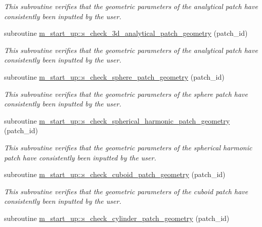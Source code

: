 \begin{DoxyCompactItemize}
\begin{DoxyCompactList}\small\item\em This subroutine verifies that the geometric parameters of the analytical patch have consistently been inputted by the user. \end{DoxyCompactList}\item 
subroutine \hyperlink{namespacem__start__up_a936948a39ac13e74203588cae06b325f}{m\+\_\+start\+\_\+up\+::s\+\_\+check\+\_\+3d\+\_\+analytical\+\_\+patch\+\_\+geometry} (patch\+\_\+id)
\begin{DoxyCompactList}\small\item\em This subroutine verifies that the geometric parameters of the analytical patch have consistently been inputted by the user. \end{DoxyCompactList}\item 
subroutine \hyperlink{namespacem__start__up_a3bc334d434726c8cdba2f5d611ec4d42}{m\+\_\+start\+\_\+up\+::s\+\_\+check\+\_\+sphere\+\_\+patch\+\_\+geometry} (patch\+\_\+id)
\begin{DoxyCompactList}\small\item\em This subroutine verifies that the geometric parameters of the sphere patch have consistently been inputted by the user. \end{DoxyCompactList}\item 
subroutine \hyperlink{namespacem__start__up_a59bfdd1a0d03041d57f7f9e7e1a38a97}{m\+\_\+start\+\_\+up\+::s\+\_\+check\+\_\+spherical\+\_\+harmonic\+\_\+patch\+\_\+geometry} (patch\+\_\+id)
\begin{DoxyCompactList}\small\item\em This subroutine verifies that the geometric parameters of the spherical harmonic patch have consistently been inputted by the user. \end{DoxyCompactList}\item 
subroutine \hyperlink{namespacem__start__up_ac9af27b20bc2249e7c015c76061b5515}{m\+\_\+start\+\_\+up\+::s\+\_\+check\+\_\+cuboid\+\_\+patch\+\_\+geometry} (patch\+\_\+id)
\begin{DoxyCompactList}\small\item\em This subroutine verifies that the geometric parameters of the cuboid patch have consistently been inputted by the user. \end{DoxyCompactList}\item 
subroutine \hyperlink{namespacem__start__up_ad6c503541113565dcac0b49b11ff3afb}{m\+\_\+start\+\_\+up\+::s\+\_\+check\+\_\+cylinder\+\_\+patch\+\_\+geometry} (patch\+\_\+id)

\end{DoxyCompactItemize}
